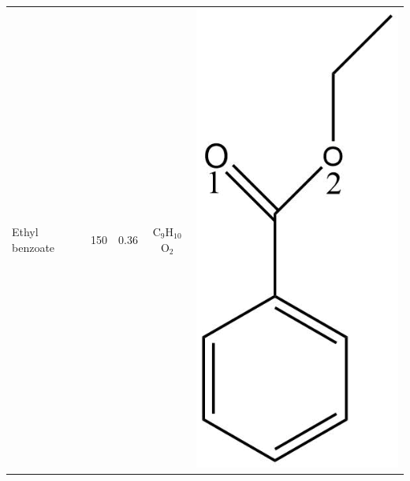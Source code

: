 \begin{table}
\begin{tabular}{lcccc}
\midrule
Ethyl benzoate &   150 &0.36&   C$_{9}$H$_{10}$O$_2$ & \begin{minipage}[c]{0.105\linewidth}\centering \includegraphics[width=\linewidth]{pics/cocaine-chapter/EtBz_struct.png}\end{minipage}\\ 

\end{tabular}
\end{table}
